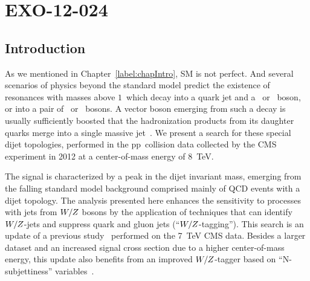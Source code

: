 \chapter{EXO-12-024}
\section{Introduction}
\label{sec:introduction}

As we mentioned in Chapter~\ref{label:chapIntro}, SM is not perfect. 
And several scenarios of physics beyond the standard model predict the
existence of resonances with masses above $1$~\TeVcc which decay into a
quark jet and a \PW\ or \cPZ\ boson, or into a pair of \PW\ or \cPZ\
bosons.  A vector boson emerging from such a decay is usually
sufficiently boosted that the hadronization products from its daughter
quarks merge into a single massive jet~\cite{Gouzevitch:2013qca}.  We
present a search for these special dijet topologies, performed in the
pp~collision data collected by the CMS experiment
in 2012 at a center-of-mass energy of 8~TeV.

The signal is characterized by a peak in the dijet invariant mass,
emerging from the falling standard model background comprised mainly
of QCD events with a dijet topology. The analysis presented here
enhances the sensitivity to processes with jets from $W/Z$ bosons
by the application of techniques that can identify $W/Z$-jets and
suppress quark and gluon jets (``$W/Z$-tagging'').  This search
is an update of a previous study~\cite{ref_2011} performed on the
7~TeV CMS data. Besides a larger dataset and an increased signal cross
section due to a higher center-of-mass energy, this update also
benefits from an improved $W/Z$-tagger based on
``N-subjettiness'' variables~\cite{Thaler:2010tr}.

